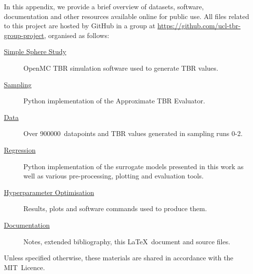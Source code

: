 In this appendix, we provide a brief overview of datasets, software, documentation 
and other resources available online for public use. All files related to this
project are hosted by GitHub in a group at
\url{https://github.com/ucl-tbr-group-project}, organised as follows:
\begin{description}
	\item[\href{https://github.com/ucl-tbr-group-project/simple-sphere-study}{Simple Sphere Study}]
		OpenMC TBR simulation software used to generate TBR values.
	\item[\href{https://github.com/ucl-tbr-group-project/sampling}{Sampling}]
		Python implementation of the Approximate TBR Evaluator.
	\item[\href{https://github.com/ucl-tbr-group-project/data}{Data}]
		Over \num{900000}~datapoints and TBR values generated in sampling runs 0-2.
	\item[\href{https://github.com/ucl-tbr-group-project/regression}{Regression}]
		Python implementation of the surrogate models presented in this work as
		well as various pre-processing, plotting and evaluation tools.
	\item[\href{https://github.com/ucl-tbr-group-project/hyperopt}{Hyperparameter Optimisation}]
		Results, plots and software commands used to produce them.
	\item[\href{https://github.com/ucl-tbr-group-project/documentation}{Documentation}]
		Notes, extended bibliography, this \LaTeX\  document and source files.
\end{description}

Unless specified otherwise, these materials are shared in accordance with the MIT~Licence.

